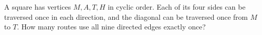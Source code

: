 A square has vertices $M,A,T,H$ in cyclic order. Each of its four sides can be traversed once in each direction, and the diagonal can be traversed once from $M$ to $T$. How many routes use all nine directed edges exactly once?
